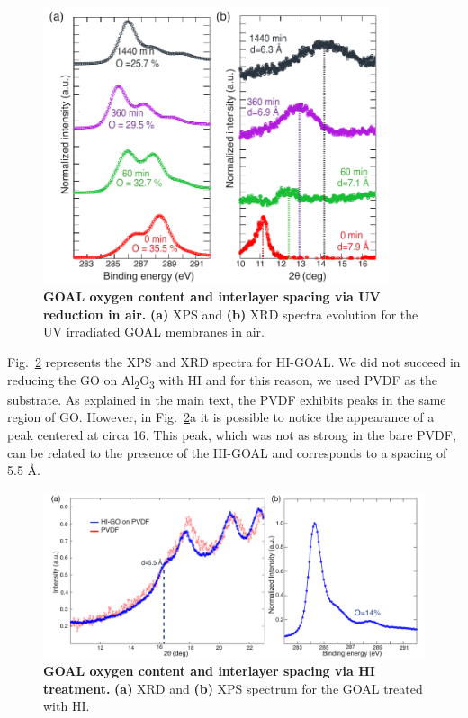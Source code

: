 \begin{figure}[h!]
  \centering
  \includegraphics[width=4in]{paper4/FigS4.pdf}
  \caption{\textbf{GOAL oxygen content and interlayer spacing via UV reduction in air.} \textbf{(a)} XPS and \textbf{(b)} XRD spectra evolution for the UV irradiated GOAL membranes in air.} 
  \label{figS4_AppC}
\end{figure}

Fig.~\ref{figS5_AppC} represents the XPS and XRD spectra for HI-GOAL. We did not succeed in reducing the GO on Al\textsubscript{2}O\textsubscript{3} with HI and for this reason, we used PVDF as the substrate. As explained in the main text, the PVDF exhibits peaks in the same region of GO. However, in Fig.~\ref{figS5_AppC}a it is possible to notice the appearance of a peak centered at circa 16\textdegree. This peak, which was not as strong in the bare PVDF, can be related to the presence of the HI-GOAL and corresponds to a spacing of 5.5 {\AA}.

\begin{figure}[h!]
  \centering
  \includegraphics[width=6in]{paper4/FigS5.pdf}
  \caption{\textbf{ GOAL oxygen content and interlayer spacing via HI treatment.} \textbf{(a)} XRD and \textbf{(b)} XPS  spectrum for the GOAL treated with HI. } 
  \label{figS5_AppC}
\end{figure}


